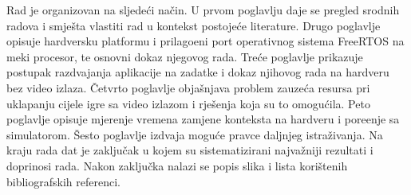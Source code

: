 Rad je organizovan na sljede\'ci na\v{c}in. U prvom poglavlju daje se pregled
srodnih radova i smje\v{s}ta vlastiti rad u kontekst postoje\'ce literature.
Drugo poglavlje opisuje hardversku platformu i prilago\dj{}eni port operativnog
sistema FreeRTOS na meki procesor, te osnovni dokaz njegovog rada. Tre\'ce
poglavlje prikazuje postupak razdvajanja aplikacije na zadatke i dokaz njihovog
rada na hardveru bez video izlaza. \v{C}etvrto poglavlje obja\v{s}njava problem
zauze\'ca resursa pri uklapanju cijele igre sa video izlazom i rje\v{s}enja koja
su to omogu\'cila. Peto poglavlje opisuje mjerenje vremena zamjene konteksta na
hardveru i pore\dj{}enje sa simulatorom. \v{S}esto poglavlje izdvaja mogu\'ce
pravce daljnjeg istra\v{z}ivanja. Na kraju rada dat je zaklju\v{c}ak u kojem su
sistematizirani najva\v{z}niji rezultati i doprinosi rada. Nakon zaklju\v{c}ka
nalazi se popis slika i lista kori\v{s}tenih bibliografskih referenci.
